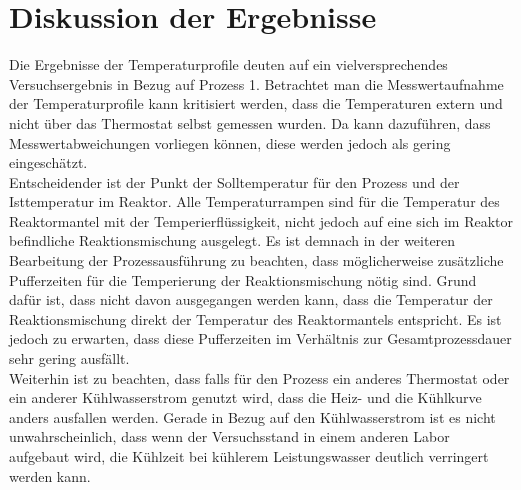 \section{Diskussion der Ergebnisse}
\label{sec:diskussion}

Die Ergebnisse der Temperaturprofile deuten auf ein vielversprechendes Versuchsergebnis in Bezug auf Prozess 1. Betrachtet man die Messwertaufnahme der Temperaturprofile kann kritisiert werden, dass die Temperaturen extern und nicht über das Thermostat selbst gemessen wurden. Da kann dazuführen, dass Messwertabweichungen vorliegen können, diese werden jedoch als gering eingeschätzt.\\
Entscheidender ist der Punkt der Solltemperatur für den Prozess und der Isttemperatur im Reaktor. Alle Temperaturrampen sind für die Temperatur des Reaktormantel mit der Temperierflüssigkeit, nicht jedoch auf eine sich im Reaktor befindliche Reaktionsmischung ausgelegt. Es ist demnach in der weiteren Bearbeitung der Prozessausführung zu beachten, dass möglicherweise zusätzliche Pufferzeiten für die Temperierung der Reaktionsmischung nötig sind. Grund dafür ist, dass nicht davon ausgegangen werden kann, dass die Temperatur der Reaktionsmischung direkt der Temperatur des Reaktormantels entspricht. Es ist jedoch zu erwarten, dass diese Pufferzeiten im Verhältnis zur Gesamtprozessdauer sehr gering ausfällt.\\
Weiterhin ist zu beachten, dass falls für den Prozess ein anderes Thermostat oder ein anderer Kühlwasserstrom genutzt wird, dass die Heiz- und die Kühlkurve anders ausfallen werden. Gerade in Bezug auf den Kühlwasserstrom ist es nicht unwahrscheinlich, dass wenn der Versuchsstand in einem anderen Labor aufgebaut wird, die Kühlzeit bei kühlerem Leistungswasser deutlich verringert werden kann.\\

